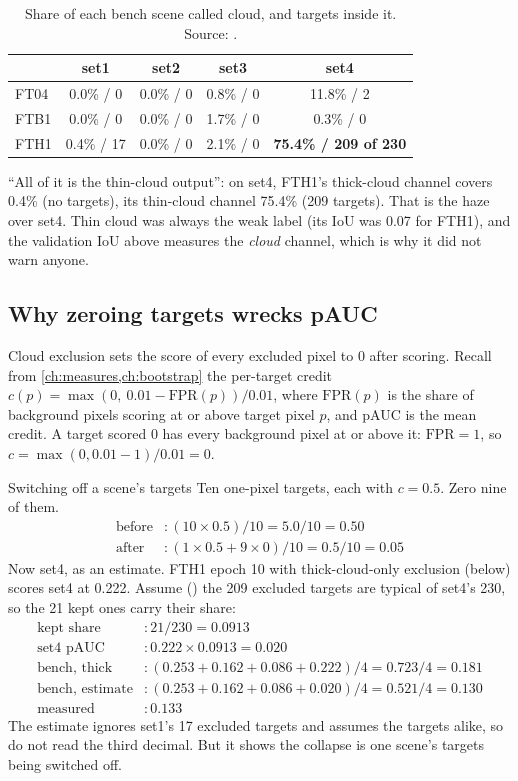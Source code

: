 \begin{table}[htbp]
\centering
\begin{tabular}{lcccc}
\toprule
 & set1 & set2 & set3 & set4\\
\midrule
FT04 & 0.0\% / 0 & 0.0\% / 0 & 0.8\% / 0 & 11.8\% / 2\\
FTB1 & 0.0\% / 0 & 0.0\% / 0 & 1.7\% / 0 & 0.3\% / 0\\
FTH1 & 0.4\% / 17 & 0.0\% / 0 & 2.1\% / 0 & \textbf{75.4\% / 209 of 230}\\
\bottomrule
\end{tabular}
\caption{Share of each bench scene called cloud, and targets inside it. Source: .}
\label{tab:heavy:cloudshare}
\end{table}

``All of it is the thin-cloud output'': on set4, FTH1's thick-cloud channel covers 0.4\% (no targets), its
thin-cloud channel 75.4\% (209 targets). That is the haze over set4. Thin cloud was always the weak label (its IoU
was 0.07 for FTH1), and the validation IoU above measures the \emph{cloud} channel, which is why it did not warn
anyone.

\subsection{Why zeroing targets wrecks pAUC}

Cloud exclusion sets the score of every excluded pixel to 0 after scoring. Recall from
\cref{ch:measures,ch:bootstrap} the per-target credit $c(p)=\max(0,\ 0.01-\mathrm{FPR}(p))/0.01$, where
$\mathrm{FPR}(p)$ is the share of background pixels scoring at or above target pixel $p$, and pAUC is the mean
credit. A target scored 0 has every background pixel at or above it: $\mathrm{FPR}=1$, so
$c=\max(0,0.01-1)/0.01=0$.

\begin{worked}[label={we:heavy:zero}]{Switching off a scene's targets}
Ten one-pixel targets, each with $c=0.5$. Zero nine of them.
\begin{align*}
\text{before} &: (10\times0.5)/10 = 5.0/10 = 0.50\\
\text{after} &: (1\times0.5 + 9\times0)/10 = 0.5/10 = 0.05
\end{align*}
Now set4, as an estimate. FTH1 epoch 10 with thick-cloud-only exclusion (below) scores set4 at 0.222. Assume
(\tagA) the 209 excluded targets are typical of set4's 230, so the 21 kept ones carry their share:
\begin{align*}
\text{kept share} &: 21/230 = 0.0913\\
\text{set4 pAUC} &: 0.222\times0.0913 = 0.020\\
\text{bench, thick} &: (0.253+0.162+0.086+0.222)/4 = 0.723/4 = 0.181\\
\text{bench, estimate} &: (0.253+0.162+0.086+0.020)/4 = 0.521/4 = 0.130\\
\text{measured} &: 0.133
\end{align*}
The estimate ignores set1's 17 excluded targets and assumes the targets alike, so do not read the third decimal.
But it shows the collapse is one scene's targets being switched off.
\end{worked}

